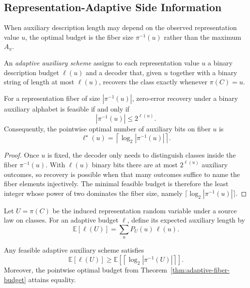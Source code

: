 \subsection{Representation-Adaptive Side Information}

When auxiliary description length may depend on the observed representation value $u$, the optimal budget is the fiber size $\pi^{-1}(u)$ rather than the maximum $A_\pi$.

\begin{definition}
An \emph{adaptive auxiliary scheme} assigns to each representation value $u$ a binary description budget $\ell(u)$ and a decoder that, given $u$ together with a binary string of length at most $\ell(u)$, recovers the class exactly whenever $\pi(C)=u$.
\end{definition}

\begin{theorem}\label{thm:adaptive-fiber-budget}
For a representation fiber of size $|\pi^{-1}(u)|$, zero-error recovery under a binary auxiliary alphabet is feasible if and only if
\[
|\pi^{-1}(u)| \le 2^{\ell(u)}.
\]
Consequently, the pointwise optimal number of auxiliary bits on fiber $u$ is
\[
\ell^\star(u) = \left\lceil \log_2 |\pi^{-1}(u)| \right\rceil.
\]
\end{theorem}

\begin{proof}
Once $u$ is fixed, the decoder only needs to distinguish classes inside the fiber $\pi^{-1}(u)$. With $\ell(u)$ binary bits there are at most $2^{\ell(u)}$ auxiliary outcomes, so recovery is possible when that many outcomes suffice to name the fiber elements injectively. The minimal feasible budget is therefore the least integer whose power of two dominates the fiber size, namely $\lceil \log_2 |\pi^{-1}(u)| \rceil$.
\end{proof}

\begin{definition}
Let $U=\pi(C)$ be the induced representation random variable under a source law on classes. For an adaptive budget $\ell$, define its expected auxiliary length by
\[
\mathbb E[\ell(U)] = \sum_u P_U(u)\,\ell(u).
\]
\end{definition}

\begin{theorem}\label{thm:adaptive-expected-rate-lower-bound}
Any feasible adaptive auxiliary scheme satisfies
\[
\mathbb E[\ell(U)] \ge \mathbb E\!\left[\left\lceil \log_2 |\pi^{-1}(U)| \right\rceil\right].
\]
Moreover, the pointwise optimal budget from Theorem~\ref{thm:adaptive-fiber-budget} attains equality.
\end{theorem}

